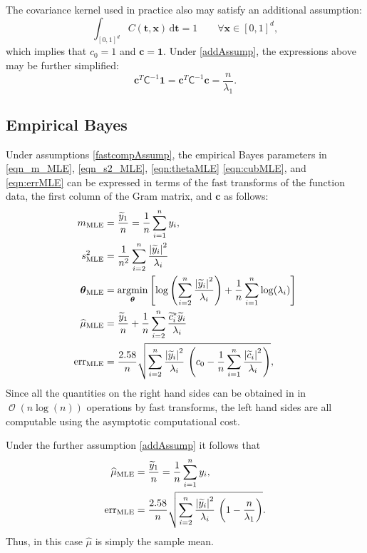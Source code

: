 \documentclass[twocolumn]{svjour3}          %
\DeclareMathOperator{\Order}{{\mathcal O}}
\newcommand{\bm}[1]{\boldsymbol{#1}}
\newcommand{\D}[1]{\text{d}{#1}}
\newcommand{\vtheta}{{\bm{\theta}}}
\newcommand{\vc}{\bm{c}}
\newcommand{\vt}{\bm{t}}
\newcommand{\vx}{\bm{x}}
\newcommand{\vone}{\bm{1}}
\newcommand{\mCInv}{{\mathsf{C}^{-1}}}
\newcommand{\hmu}{\widehat{\mu}}
\newcommand{\MLE}{\text{MLE}}
\newcommand{\err}{\textup{err}}
\def\abs#1{\ensuremath{\left \lvert #1 \right \rvert}}
\providecommand{\argmin}{\operatorname*{argmin}}
\begin{document}
The covariance kernel used in practice also may satisfy an additional assumption:
\begin{equation} \label{addAssump}
\int_{[0,1]^d} C(\vt,\vx) \, \D \vt = 1 \qquad \forall \vx \in [0,1]^d,
\end{equation}
which implies that $c_0 = 1$ and $\vc = \vone$.  Under \eqref{addAssump}, the expressions above may be further simplified:
\begin{equation*}
\vc^T\mCInv \vone =
\vc^T\mCInv \vc = \frac{n}{\lambda_1}.
\end{equation*}


\subsection{Empirical Bayes}

Under assumptions \eqref{fastcompAssump}, the empirical Bayes parameters in \eqref{eqn_m_MLE}, \eqref{eqn_s2_MLE}, \eqref{eqn:thetaMLE} \eqref{eqn:cubMLE}, and \eqref{eqn:errMLE} can be expressed in terms of the fast transforms of the function data, the first column of the Gram matrix, and $\vc$ as follows:
\begin{align}
\nonumber
m_\MLE &=  \frac{\widetilde{y}_1}{n} = \frac 1n \sum_{i=1}^n y_i,
\\
\nonumber
s^2_\MLE 
& =
\frac{1}{n^2} 
\sum_{i=2}^n \frac{\abs{\widetilde{y}_i}^2}{\lambda_i} \\
\label{eqn_MLE_loss_func_optimized_2}\vtheta_\MLE
&= 
\argmin_{\vtheta}
\left[
\log\left(
\sum_{i=2}^n \frac{\abs{\widetilde{y}_i}^2}{\lambda_i}
\right) 
  + 
\frac{1}{n}\sum_{i=1}^n \log(\lambda_i)
\right]
\\
\hmu_\MLE  &= 
\frac{\widetilde{y}_1}{n} +
\frac 1n \sum_{i=2}^n \frac{ \widetilde{c}_i^* \widetilde{y}_i}{\lambda_i} \\
\err_\MLE  &
=
\frac{2.58}{n}\sqrt{
	\sum_{i=2}^{n} \frac{\abs{\widetilde{y}_i}^2}{\lambda_i}  
	\,
	\left( c_0 - \frac 1n \sum_{i=1}^n \frac{\abs{\widetilde{c}_i}^2}{\lambda_i} \right) 
},
\end{align}
Since all the quantities on the right hand sides can be obtained in in $\Order(n \log(n))$ operations by fast transforms, the left hand sides are all computable using the asymptotic computational cost.

Under the further assumption \eqref{addAssump} it follows that 
\begin{align}
\nonumber
\hmu_\MLE  &= 
\frac{\widetilde{y}_1}{n} = \frac 1n \sum_{i=1}^n y_i,\\
\label{eq:errMLEAllAsump}
\err_\MLE  &
=
\frac{2.58}{n}\sqrt{
	\sum_{i=2}^{n} \frac{\abs{\widetilde{y}_i}^2}{\lambda_i}  
	\,
	\left( 1 -  \frac{n}{\lambda_1} \right) 
}.
\end{align}
Thus, in this  case $\hmu$ is simply the sample mean.
\end{document}
